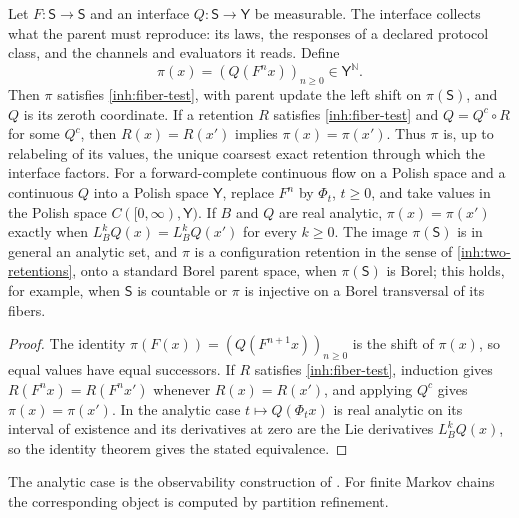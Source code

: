Let $F:\mathsf S\to\mathsf S$ and an interface $Q:\mathsf S\to\mathsf Y$ be
measurable. The interface collects what the parent must reproduce: its laws,
the responses of a declared protocol class, and the channels and evaluators
it reads. Define
\begin{equation}
 \pi(x)=(Q(F^nx))_{n\geq0}\in\mathsf Y^{\mathbb N}.
 \label{inh:canonical-retention}
\end{equation}
Then $\pi$ satisfies \cref{inh:fiber-test}, with parent update the left
shift on $\pi(\mathsf S)$, and $Q$ is its zeroth coordinate. If a retention
$R$ satisfies \cref{inh:fiber-test} and $Q=Q^c\circ R$ for some $Q^c$, then
$R(x)=R(x')$ implies $\pi(x)=\pi(x')$. Thus $\pi$ is, up to relabeling of its
values, the unique coarsest exact retention through which the interface
factors. For a forward-complete continuous flow on a Polish space and a
continuous $Q$ into a Polish space $\mathsf Y$, replace $F^n$ by $\Phi_t$,
$t\geq0$, and take values in the Polish space $C([0,\infty),\mathsf Y)$. If
$B$ and $Q$ are real analytic, $\pi(x)=\pi(x')$ exactly when
$L_B^kQ(x)=L_B^kQ(x')$ for every $k\geq0$. The image $\pi(\mathsf S)$ is in
general an analytic set, and $\pi$ is a configuration retention in the
sense of \cref{inh:two-retentions}, onto a standard Borel parent space, when
$\pi(\mathsf S)$ is Borel; this holds, for example, when $\mathsf S$ is
countable or $\pi$ is injective on a Borel transversal of its fibers.

\begin{proof}
The identity $\pi(F(x))=(Q(F^{n+1}x))_{n\geq0}$ is the shift of $\pi(x)$, so
equal values have equal successors. If $R$ satisfies \cref{inh:fiber-test},
induction gives $R(F^nx)=R(F^nx')$ whenever $R(x)=R(x')$, and applying $Q^c$
gives $\pi(x)=\pi(x')$. In the analytic case $t\mapsto Q(\Phi_tx)$ is real
analytic on its interval of existence and its derivatives at zero are the
Lie derivatives $L_B^kQ(x)$, so the identity theorem gives the stated
equivalence.
\end{proof}

The analytic case is the observability construction of
\citet{HermannKrener1977}. For finite Markov chains the corresponding object
is computed by partition refinement.

